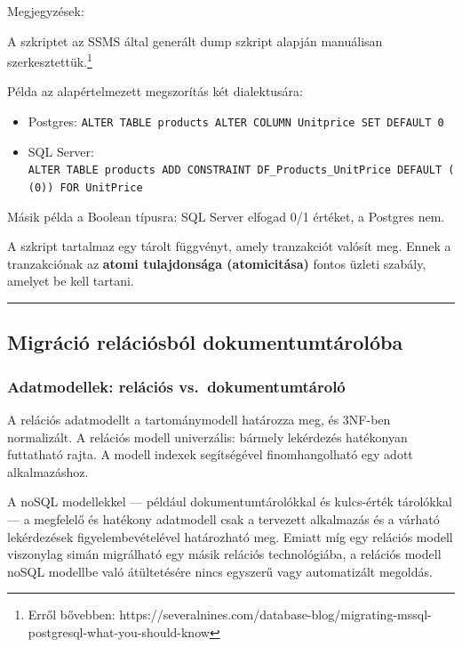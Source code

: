 \documentclass[
  magyar,
]{article}
\providecommand{\tightlist}{%
  \setlength{\itemsep}{0pt}\setlength{\parskip}{0pt}}
\begin{document}
Megjegyzések:

A szkriptet az SSMS által generált dump szkript alapján manuálisan
szerkesztettük.\footnote{Erről bővebben:
  https://severalnines.com/database-blog/migrating-mssql-postgresql-what-you-should-know}

Példa az alapértelmezett megszorítás két dialektusára:

\begin{itemize}
\tightlist
\item
  Postgres:
  \texttt{ALTER\ TABLE\ products\ ALTER\ COLUMN\ Unitprice\ SET\ DEFAULT\ 0}
\item
  SQL Server:
  \texttt{ALTER\ TABLE\ products\ ADD\ CONSTRAINT\ DF\_Products\_UnitPrice\ DEFAULT\ ((0))\ FOR\ UnitPrice}
\end{itemize}

Másik példa a Boolean típusra: SQL Server elfogad 0/1 értéket, a
Postgres nem.

A szkript tartalmaz egy tárolt függvényt, amely tranzakciót valósít meg.
Ennek a tranzakciónak az \textbf{atomi tulajdonsága (atomicitása)}
fontos üzleti szabály, amelyet be kell tartani.

\begin{center}\rule{0.5\linewidth}{0.5pt}\end{center}

\subsection{Migráció relációsból
dokumentumtárolóba}\label{migruxe1ciuxf3-reluxe1ciuxf3sbuxf3l-dokumentumtuxe1roluxf3ba}

\subsubsection{Adatmodellek: relációs
vs.~dokumentumtároló}\label{adatmodellek-reluxe1ciuxf3s-vs.-dokumentumtuxe1roluxf3}

A relációs adatmodellt a tartománymodell határozza meg, és 3NF-ben
normalizált. A relációs modell univerzális: bármely lekérdezés
hatékonyan futtatható rajta. A modell indexek segítségével
finomhangolható egy adott alkalmazáshoz.

A noSQL modellekkel --- például dokumentumtárolókkal és kulcs-érték
tárolókkal --- a megfelelő és hatékony adatmodell csak a tervezett
alkalmazás és a várható lekérdezések figyelembevételével határozható
meg. Emiatt míg egy relációs modell viszonylag simán migrálható egy
másik relációs technológiába, a relációs modell noSQL modellbe való
átültetésére nincs egyszerű vagy automatizált megoldás.
\end{document}
